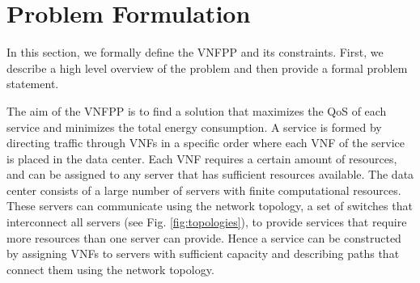 

\section{Problem Formulation}
\label{sec:problem_formulation}

In this section, we formally define the VNFPP and its constraints. First, we describe a high level overview of the problem and then provide a formal problem statement.

The aim of the VNFPP is to find a solution that maximizes the QoS of each service and minimizes the total energy consumption. A service is formed by directing traffic through VNFs in a specific order where each VNF of the service is placed in the data center. Each VNF requires a certain amount of resources, and can be assigned to any server that has sufficient resources available. The data center consists of a large number of servers with finite computational resources. These servers can communicate using the network topology, a set of switches that interconnect all servers (see Fig. \ref{fig:topologies}), to provide services that require more resources than one server can provide. Hence a service can be constructed by assigning VNFs to servers with sufficient capacity and describing paths that connect them using the network topology.


